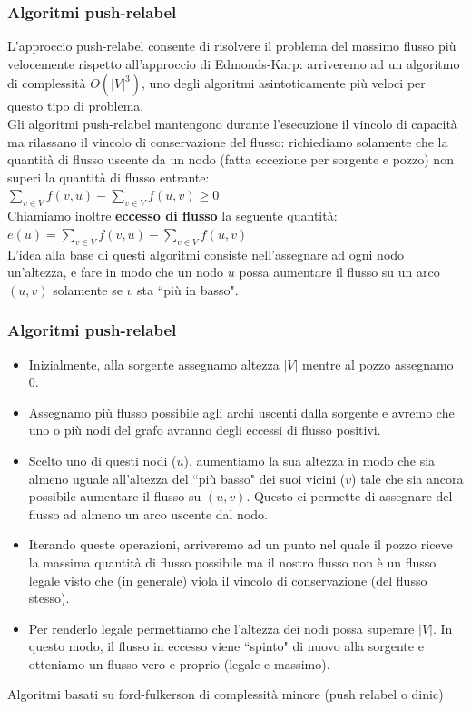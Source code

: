 \documentclass{beamer}
\begin{document}
\begin{frame}
\frametitle{Algoritmi push-relabel}
L'approccio push-relabel consente di risolvere il problema del massimo flusso più velocemente rispetto all'approccio di Edmonds-Karp: arriveremo ad un algoritmo di complessità $O(|V|^3)$, uno degli algoritmi asintoticamente più veloci per questo tipo di problema.\\
Gli algoritmi push-relabel mantengono durante l'esecuzione il vincolo di capacità ma rilassano il vincolo di conservazione del flusso: richiediamo solamente che la quantità di flusso uscente da un nodo (fatta eccezione per sorgente e pozzo) non superi la quantità di flusso entrante:\\
$\sum\limits_{v\in V}f(v,u)-\sum\limits_{v\in V}f(u,v)\geq 0$\\
Chiamiamo inoltre \textbf{eccesso di flusso} la seguente quantità:\\
$e(u)=\sum\limits_{v\in V}f(v,u)-\sum\limits_{v\in V}f(u,v)$\\
L'idea alla base di questi algoritmi consiste nell'assegnare ad ogni nodo un'altezza, e fare in modo che un nodo $u$ possa aumentare il flusso su un arco $(u,v)$ solamente se $v$ sta ``più in basso".
\end{frame}

\begin{frame}
\frametitle{Algoritmi push-relabel}
\begin{itemize}
\item Inizialmente, alla sorgente assegnamo altezza $|V|$ mentre al pozzo assegnamo 0.
\item Assegnamo più flusso possibile agli archi uscenti dalla sorgente e avremo che uno o più nodi del grafo avranno degli eccessi di flusso positivi.
\item Scelto uno di questi nodi ($u$), aumentiamo la sua altezza in modo che sia almeno uguale all'altezza del ``più basso" dei suoi vicini ($v$) tale che sia ancora possibile aumentare il flusso su $(u,v)$. Questo ci permette di assegnare del flusso ad almeno un arco uscente dal nodo.
\item Iterando queste operazioni, arriveremo ad un punto nel quale il pozzo riceve la massima quantità di flusso possibile ma il nostro flusso non è un flusso legale visto che (in generale) viola il vincolo di conservazione (del flusso stesso).
\item Per renderlo legale permettiamo che l'altezza dei nodi possa superare $|V|$. In questo modo, il flusso in eccesso viene ``spinto" di nuovo alla sorgente e otteniamo un flusso vero e proprio (legale e massimo).
\end{itemize}
\end{frame}

\begin{frame}
Algoritmi basati su ford-fulkerson di complessità minore (push relabel o dinic)
\end{frame}
\end{document}
